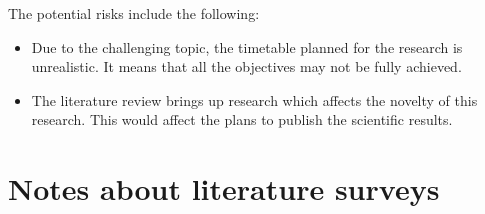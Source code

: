 \documentclass[11pt,a4,notitlepage]{article}
\begin{document}
The potential risks include the following:
%
\begin{itemize}
%
\item Due to the challenging topic, the timetable planned for the research is
unrealistic. It means that all the objectives may not be fully achieved.
%
\item The literature review brings up research which affects the novelty of this
research. This would affect the plans to publish the scientific results.
%
\end{itemize}




\appendix

\section{Notes about literature surveys}\label{sec:literature_survey}
\end{document}
